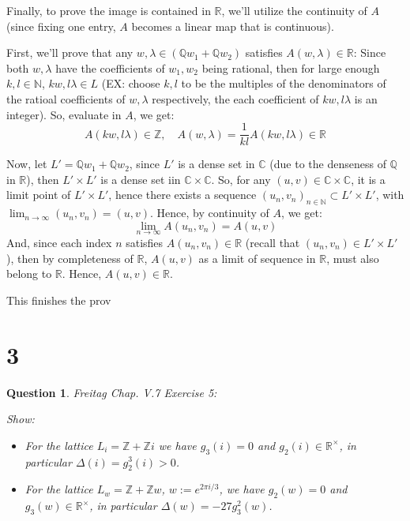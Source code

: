 \documentclass{article}
\newtheorem{question}{Question}
\begin{document}
\begin{itemize}
    Finally, to prove the image is contained in $\mathbb{R}$, we'll utilize the continuity of $A$ (since fixing one entry, $A$ becomes a linear map that is continuous). 

    First, we'll prove that any $w,\lambda\in(\mathbb{Q}w_1+\mathbb{Q}w_2)$ satisfies $A(w,\lambda) \in\mathbb{R}$: Since both $w,\lambda$ have the coefficients of $w_1,w_2$ being rational, then for large enough $k,l\in\mathbb{N}$, $kw,l\lambda\in L$ (EX: choose $k,l$ to be the multiples of the denominators of the ratioal coefficients of $w,\lambda$ respectively, the each coefficient of $kw,l\lambda$ is an integer).
    So, evaluate in $A$, we get:
    $$A(kw,l\lambda)\in\mathbb{Z},\quad A(w,\lambda) = \frac{1}{kl}A(kw,l\lambda) \in\mathbb{R}$$
    
    Now, let $L' = \mathbb{Q}w_1+\mathbb{Q}w_2$, since $L'$ is a dense set in $\mathbb{C}$ (due to the denseness of $\mathbb{Q}$ in $\mathbb{R}$), then $L'\times L'$ is a dense set iin $\mathbb{C}\times \mathbb{C}$. So, for any $(u,v)\in\mathbb{C}\times \mathbb{C}$, it is a limit point of $L'\times L'$, hence there exists a sequence $(u_n,v_n)_{n\in\mathbb{N}}\subset L'\times L'$, with $\lim_{n\rightarrow\infty}(u_n,v_n) = (u,v)$. Hence, by continuity of $A$, we get:
    $$\lim_{n\rightarrow\infty}A(u_n,v_n) = A(u,v)$$
    And, since each index $n$ satisfies $A(u_n,v_n)\in \mathbb{R}$ (recall that $(u_n,v_n)\in L'\times L'$), then by completeness of $\mathbb{R}$, $A(u,v)$ as a limit of sequence in $\mathbb{R}$, must also belong to $\mathbb{R}$. Hence, $A(u,v)\in\mathbb{R}$.

    This finishes the prov

    
\end{itemize}

\break

\section*{3}
\begin{myBox}[]{}
    \begin{question}
        Freitag Chap. V.7 Exercise 5:

        Show:
        \begin{itemize}
            \item[(a)] For the lattice $L_i=\mathbb{Z}+\mathbb{Z}i$ we have $g_3(i)=0$ and $g_2(i)\in\mathbb{R}^\times$, in particular $\Delta(i)=g_2^3(i)>0$.
            \item[(b)] For the lattice $L_w=\mathbb{Z}+\mathbb{Z}w$, $w:=e^{2\pi i/3}$, we have $g_2(w)=0$ and $g_3(w)\in\mathbb{R}^\times$, in particular $\Delta(w)=-27g_3^2(w)$. 
        \end{itemize}
    \end{question}
\end{myBox}
\end{document}
